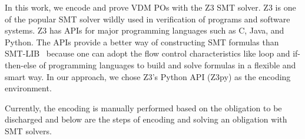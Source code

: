 
In this work, we encode and prove VDM POs with the Z3 SMT solver. Z3 is one of the popular SMT solver wildly used in verification of programs and software systems. Z3 has APIs for major programming languages such as C, Java, and Python. The APIs provide a better way of constructing SMT formulas than SMT-LIB~\cite{BarFT-SMTLIB} because one can adopt the flow control characteristics like loop and if-then-else of programming languages to build and solve formulas in a flexible and smart way. In our approach, we chose Z3's Python API (Z3py) as the encoding environment. 

Currently, the encoding is manually performed based on the obligation to be discharged and below are the steps of encoding and solving an obligation with SMT solvers.

